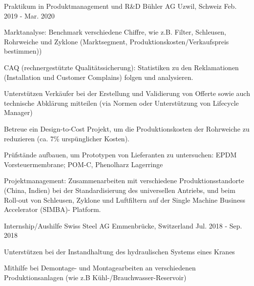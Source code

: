 

\begin{cventries}

\cventry
	{Praktikum in Produktmanagement und R\&D} %
	{Bühler AG} %
	{Uzwil, Schweiz} %
	{Feb. 2019 - Mar. 2020} %
	{
		\begin{cvitems} %
			\item {Marktanalyse: Benchmark verschiedene Chiffre, wie z.B. Filter, Schleusen, Rohrweiche und Zyklone (Marktsegment, Produktionskosten/Verkaufspreis bestimmen))}
			\item {CAQ (rechnergestützte Qualitätssicherung): Statistiken zu den Reklamationen (Installation und Customer Complains) folgen und analysieren.}
			\item {Unterstützen Verkäufer bei der Erstellung und Validierung von Offerte sowie auch technische Abklärung mitteilen (via Normen oder Unterstützung von Lifecycle Manager) }
			\item {Betreue ein Design-to-Cost Projekt, um die Produktionskosten der Rohrweiche zu reduzieren (ca. 7\% urspünglicher Kosten).}
			\item {Prüfstände aufbauen, um Prototypen von Lieferanten zu untersuchen: EPDM Vorsteuermembrane; POM-C, Phenolharz Lagerringe}
			\item {Projektmanagement: Zusammenarbeiten mit verschiedene Produktionsstandorte (China, Indien) bei der Standardisierung des universellen Antriebs, und beim Roll-out von Schleusen, Zyklone und Luftfiltern auf der Single Machine Business Accelerator (SIMBA)- Platform.}
		\end{cvitems}
}	


\cventry
	{Internship/Aushilfe} %
	{Swiss Steel AG} %
	{Emmenbrücke, Switzerland} %
	{Jul. 2018 - Sep. 2018} %
	{
		\begin{cvitems} %
			\item {Unterstützen bei der Instandhaltung des hydraulischen Systems eines Kranes}
			\item {Mithilfe bei Demontage- und Montagearbeiten an verschiedenen Produktionsanlagen (wie z.B Kühl-/Brauchwasser-Reservoir)}
		\end{cvitems}
}	


\end{cventries}

